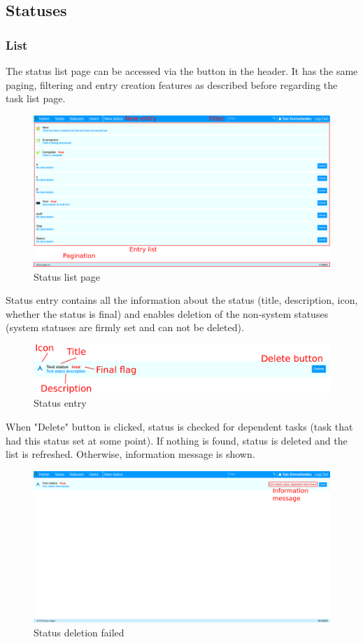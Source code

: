 \documentclass{article}
\begin{document}
\subsection{Statuses}
\subsubsection{List}
The status list page can be accessed via the button in the header. It has the same paging, filtering and entry creation features as described before regarding the task list page.
\begin{figure}[H]
    \includegraphics[width=\textwidth]{img/statuses.png}
    \caption{Status list page}
\end{figure}
Status entry contains all the information about the status (title, description, icon, whether the status is final) and enables deletion of the non-system statuses (system statuses are firmly set and can not be deleted).
\begin{figure}[H]
    \includegraphics[width=\textwidth]{img/status.png}
    \caption{Status entry}
\end{figure}
When "Delete" button is clicked, status is checked for dependent tasks (task that had this status set at some point). If nothing is found, status is deleted and the list is refreshed. Otherwise, information message is shown.
\begin{figure}[H]
    \includegraphics[width=\textwidth]{img/deletestatus.png}
    \caption{Status deletion failed}
\end{figure}
\end{document}
